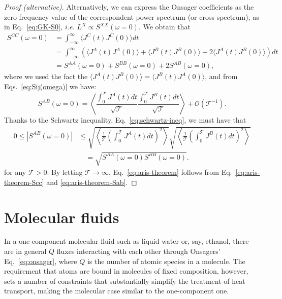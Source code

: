 \begin{LEtext}
\begin{proof}[Proof (alternative)]
Alternatively, we can express the Onsager coefficients as the zero-frequency value of the correspondent power spectrum (or cross spectrum), as in Eq.~\eqref{eq:GK-S0}, \emph{i.e.} $L^{X} \propto S^{XX}(\omega=0)$. We obtain that
\begin{align}
    S^{CC}(\omega=0) &= \int_{-\infty}^\infty \langle J^C(t) J^C(0) \rangle dt \nonumber\\
        &=\int_{-\infty}^\infty \left(\langle J^A(t) J^A(0) \rangle + \langle J^B(t) J^B(0) \rangle + 2\langle J^A(t) J^B(0) \rangle \right) dt  \nonumber\\
        &= S^{AA}(\omega=0) + S^{BB}(\omega=0) + 2 S^{AB}(\omega=0), \label{eq:aris-theorem-Scc}
\end{align}
where we used the fact the $\langle J^A(t) J^B(0) \rangle = \langle J^B(t) J^A(0) \rangle$, and from Eqs.~\eqref{eq:Sij(omega)} we have:
\begin{equation}
    S^{AB}(\omega=0) = \left\langle \frac{\int_0^\mathcal{T} J^A(t) dt}{\sqrt{\mathcal{T}}} \frac{\int_0^\mathcal{T} J^B(t) dt}{\sqrt{\mathcal{T}}} \right\rangle + \mathcal{O}(\mathcal{T}^{-1}) .
\end{equation}
Thanks to the Schwartz inequality, Eq.~\eqref{eq:schwartz-ineq}, we must have that
\begin{equation}
\begin{aligned}
    0 \leq \left|S^{AB}(\omega=0)\right| &\leq \sqrt{\left\langle\frac{1}{\mathcal{T}}\left(\int_0^\mathcal{T} J^A(t) dt\right)^2\right\rangle} \sqrt{\left\langle\frac{1}{\mathcal{T}}\left(\int_0^\mathcal{T} J^B(t) dt\right)^2\right\rangle} \\
    &\quad = \sqrt{S^{AA}(\omega=0) S^{BB}(\omega=0)} .
\end{aligned} \label{eq:aris-theorem-Sab}
\end{equation}
for any $\mathcal{T}>0$. By letting $\mathcal{T}\rightarrow\infty$, Eq.~\eqref{eq:aris-theorem} follows from Eq.~\eqref{eq:aris-theorem-Scc} and \eqref{eq:aris-theorem-Sab}.
\end{proof}
\end{LEtext}


\section{Molecular fluids}  \label{sec:MolecularFluids}
In a one-component molecular fluid such as liquid water or, say, ethanol, there are in general $Q$ fluxes interacting with each other through Onsagers' Eq.~\eqref{eq:onsager}, where $Q$ is the number of atomic species in a molecule. The requirement that atoms are bound in molecules of fixed composition, however, sets a number of constraints that substantially simplify the treatment of heat transport, making the molecular case similar to the one-component one.

